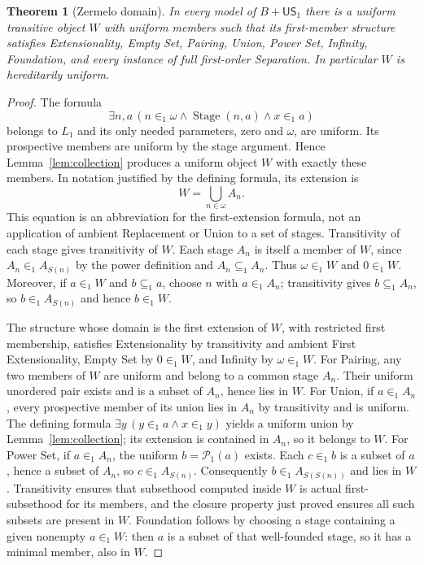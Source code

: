\documentclass[11pt,a4paper]{article}
\numberwithin{equation}{section}
\newtheorem{theorem}{Theorem}[section]
\theoremstyle{definition}
\theoremstyle{remark}
\newcommand{\US}{\mathsf{US}_1}
\newcommand{\Pow}{\mathcal P_1}
\newcommand{\subone}{\subseteq_1}
\newcommand{\extone}{\in_1}
\begin{document}
\begin{theorem}[Zermelo domain]\label{thm:zermelo}
In every model of $B+\US$ there is a uniform transitive object $W$ with uniform members such that its first-member structure satisfies Extensionality, Empty Set, Pairing, Union, Power Set, Infinity, Foundation, and every instance of full first-order Separation. In particular $W$ is hereditarily uniform.
\end{theorem}
\begin{proof}
The formula
\[\exists n,a\,(n\extone\omega\land\operatorname{Stage}(n,a)\land x\extone a)\]
belongs to $L_1$ and its only needed parameters, zero and $\omega$, are uniform. Its prospective members are uniform by the stage argument. Hence Lemma~\ref{lem:collection} produces a uniform object $W$ with exactly these members. In notation justified by the defining formula, its extension is
\[W=\bigcup_{n\in\omega} A_n.\]
This equation is an abbreviation for the first-extension formula, not an application of ambient Replacement or Union to a set of stages. Transitivity of each stage gives transitivity of $W$. Each stage $A_n$ is itself a member of $W$, since $A_n\extone A_{S(n)}$ by the power definition and $A_n\subone A_n$. Thus $\omega\extone W$ and $0\extone W$. Moreover, if $a\extone W$ and $b\subone a$, choose $n$ with $a\extone A_n$; transitivity gives $b\subone A_n$, so $b\extone A_{S(n)}$ and hence $b\extone W$.

The structure whose domain is the first extension of $W$, with restricted first membership, satisfies Extensionality by transitivity and ambient First Extensionality, Empty Set by $0\extone W$, and Infinity by $\omega\extone W$. For Pairing, any two members of $W$ are uniform and belong to a common stage $A_n$. Their uniform unordered pair exists and is a subset of $A_n$, hence lies in $W$. For Union, if $a\extone A_n$, every prospective member of its union lies in $A_n$ by transitivity and is uniform. The defining formula $\exists y\,(y\extone a\land x\extone y)$ yields a uniform union by Lemma~\ref{lem:collection}; its extension is contained in $A_n$, so it belongs to $W$. For Power Set, if $a\extone A_n$, the uniform $b=\Pow(a)$ exists. Each $c\extone b$ is a subset of $a$, hence a subset of $A_n$, so $c\extone A_{S(n)}$. Consequently $b\extone A_{S(S(n))}$ and lies in $W$. Transitivity ensures that subsethood computed inside $W$ is actual first-subsethood for its members, and the closure property just proved ensures all such subsets are present in $W$. Foundation follows by choosing a stage containing a given nonempty $a\extone W$: then $a$ is a subset of that well-founded stage, so it has a minimal member, also in $W$.


\end{proof}
\end{document}
